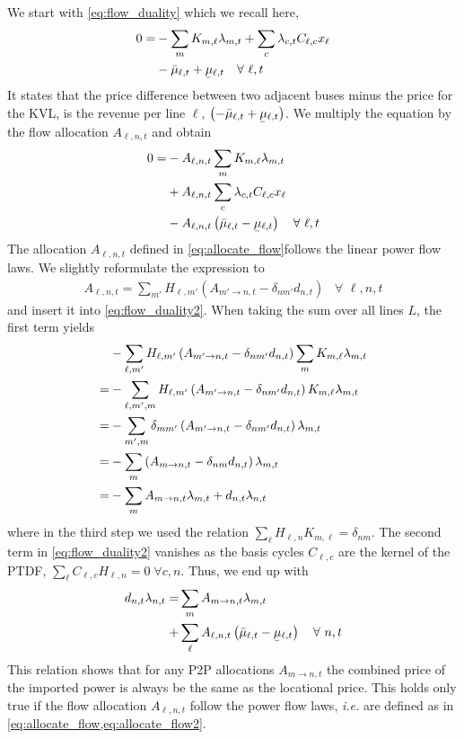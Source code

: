 \documentclass[11pt,twocolumn]{article}
\newcommand{\ie}{\textit{i.e.} }
\newcommand{\ubar}[1]{\underaccent{\bar}{#1}}
\newcommand{\Forall}[1]{\hspace{10pt} \forall \,\, #1 }
\newcommand{\mulowerflow}{\ubar{\mu}_{\ell,t}}
\newcommand{\muupperflow}{\bar{\mu}_{\ell,t}}
\newcommand{\lmp}[1][n]{\lambda_{#1,t}}
\newcommand{\demand}[1][n]{d_{#1,t}}
\newcommand{\incidence}[1][n]{K_{#1,\ell}}
\newcommand{\ptdf}[1][n]{H_{\ell,#1}}
\newcommand{\cycle}{C_{\ell,c}}
\newcommand{\reactance}{x_\ell}
\newcommand{\cycleprice}{\lambda_{c,t}}
\newcommand{\allocatepeer}[1][m \rightarrow n]{A_{#1,t}}
\newcommand{\allocateflow}[1][n]{A_{\ell,#1,t}}
\begin{document}
We start with \cref{eq:flow_duality} which we recall here, 
\begin{align}
    \notag
    0 = &- \sum_m \incidence[m] \lmp[m]  + \sum_c  \cycleprice \cycle \reactance  \\
    &- \muupperflow + \mulowerflow \Forall{\ell,t} 
\end{align}
It states that the price difference between two adjacent buses minus the price for the KVL, is the revenue per line $\ell$, $\left(- \muupperflow + \mulowerflow\right)$. We multiply the equation by the flow allocation $\allocateflow$ and obtain 
\begin{align}
    \notag
    0 =& - \allocateflow \sum_m \incidence[m] \lmp[m]  \\
    \notag
    &+ \allocateflow \sum_c  \cycleprice \cycle \reactance  \\
    &- \allocateflow \left(\muupperflow - \mulowerflow\right) \Forall{\ell,t} 
    \label{eq:flow_duality2}
\end{align}  
The allocation $\allocateflow$ defined in \cref{eq:allocate_flow}follows the linear power flow laws. We slightly reformulate the expression to
\begin{align}
    \allocateflow = \sum_{m'} \ptdf[m'] \left( \allocatepeer[m' \rightarrow n]  - \delta_{n m'} \demand \right) \Forall{\ell, n, t}
    \label{eq:allocate_flow2}
\end{align}
and insert it into \cref{eq:flow_duality2}. When taking the sum over all lines $L$, the first term yields  
\begin{align}
    \notag
    &- \sum_{\ell, m'} \ptdf[m'] \left( \allocatepeer[m' \rightarrow n]  - \delta_{n m'} \demand \right) \sum_m \incidence[m] \lmp[m] \\
    \notag
    =& - \sum_{\ell, m', m} \ptdf[m'] \left( \allocatepeer[m' \rightarrow n]  - \delta_{n m'} \demand \right) \incidence[m] \lmp[m] \\
    \notag
    =& - \sum_{m', m} \delta_{m m'} \left( \allocatepeer[m' \rightarrow n]  - \delta_{n m'} \demand \right) \lmp[m] \\
    \notag
    =& - \sum_{m} \left( \allocatepeer - \delta_{n m} \demand \right) \lmp[m] \\
    =& - \sum_{m} \allocatepeer \lmp[m] + \demand \lmp 
\end{align}
where in the third step we used the relation $\sum_\ell \ptdf \incidence[m] = \delta_{n m}$.
The second term in \cref{eq:flow_duality2} vanishes as the basis cycles $\cycle$ are the kernel of the PTDF, $\sum_{\ell} \cycle \ptdf  = 0 \; \forall c,n$. Thus, we end up with 
\begin{align}
    \notag
    \demand \lmp =& \sum_{m} \allocatepeer \lmp[m] \\
    +& \sum_\ell \allocateflow \left(\muupperflow - \mulowerflow\right) \Forall{n,t}
\end{align}
This relation shows that for any P2P allocations $\allocatepeer$ the combined price of the imported power is always be the same as the locational price. This holds only true if the flow allocation $\allocateflow$ follow the power flow laws, \ie are defined as in \cref{eq:allocate_flow,eq:allocate_flow2}. 
\end{document}
